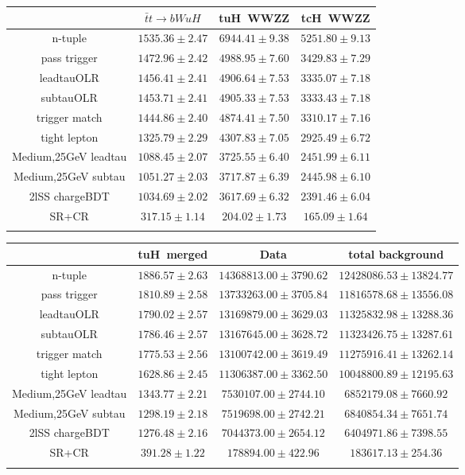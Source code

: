 \centering
\begin{tabular}{cccc} \toprule\toprule
 & $\bar{t}t\to bWuH$ & tuH~WWZZ & tcH~WWZZ\\\midrule
n-tuple & $1535.36\pm2.47$ & $6944.41\pm9.38$ & $5251.80\pm9.13$\\
pass trigger & $1472.96\pm2.42$ & $4988.95\pm7.60$ & $3429.83\pm7.29$\\
leadtauOLR & $1456.41\pm2.41$ & $4906.64\pm7.53$ & $3335.07\pm7.18$\\
subtauOLR & $1453.71\pm2.41$ & $4905.33\pm7.53$ & $3333.43\pm7.18$\\
trigger match & $1444.86\pm2.40$ & $4874.41\pm7.50$ & $3310.17\pm7.16$\\
tight lepton & $1325.79\pm2.29$ & $4307.83\pm7.05$ & $2925.49\pm6.72$\\
Medium,25GeV leadtau & $1088.45\pm2.07$ & $3725.55\pm6.40$ & $2451.99\pm6.11$\\
Medium,25GeV subtau & $1051.27\pm2.03$ & $3717.87\pm6.39$ & $2445.98\pm6.10$\\
2lSS chargeBDT & $1034.69\pm2.02$ & $3617.69\pm6.32$ & $2391.46\pm6.04$\\
SR+CR & $317.15\pm1.14$ & $204.02\pm1.73$ & $165.09\pm1.64$\\
\bottomrule\bottomrule\\
\end{tabular}
\begin{tabular}{cccc} \toprule\toprule
 & tuH~merged & Data & total background\\\midrule
n-tuple & $1886.57\pm2.63$ & $14368813.00\pm3790.62$ & $12428086.53\pm13824.77$\\
pass trigger & $1810.89\pm2.58$ & $13733263.00\pm3705.84$ & $11816578.68\pm13556.08$\\
leadtauOLR & $1790.02\pm2.57$ & $13169879.00\pm3629.03$ & $11325832.98\pm13288.36$\\
subtauOLR & $1786.46\pm2.57$ & $13167645.00\pm3628.72$ & $11323426.75\pm13287.61$\\
trigger match & $1775.53\pm2.56$ & $13100742.00\pm3619.49$ & $11275916.41\pm13262.14$\\
tight lepton & $1628.86\pm2.45$ & $11306387.00\pm3362.50$ & $10048800.89\pm12195.63$\\
Medium,25GeV leadtau & $1343.77\pm2.21$ & $7530107.00\pm2744.10$ & $6852179.08\pm7660.92$\\
Medium,25GeV subtau & $1298.19\pm2.18$ & $7519698.00\pm2742.21$ & $6840854.34\pm7651.74$\\
2lSS chargeBDT & $1276.48\pm2.16$ & $7044373.00\pm2654.12$ & $6404971.86\pm7398.55$\\
SR+CR & $391.28\pm1.22$ & $178894.00\pm422.96$ & $183617.13\pm254.36$\\
\bottomrule\bottomrule\\
\end{tabular}
